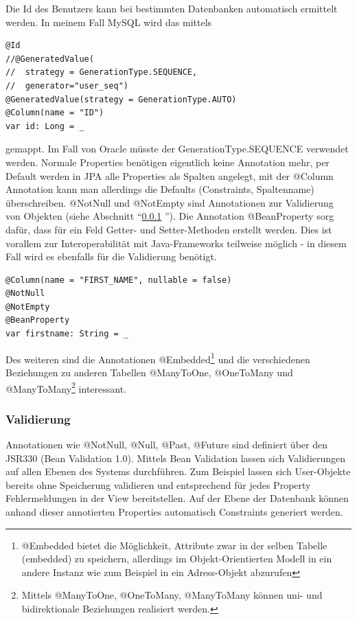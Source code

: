 Die Id des Benutzers kann bei bestimmten Datenbanken automatisch ermittelt werden. In meinem Fall MySQL wird das mittels 
\begin{lstlisting}[caption=User: ScalaJPA Id mit Auto-Increment]
@Id
//@GeneratedValue(
//	strategy = GenerationType.SEQUENCE, 
//	generator="user_seq")
@GeneratedValue(strategy = GenerationType.AUTO)
@Column(name = "ID")
var id: Long = _
\end{lstlisting}
gemappt. Im Fall von Oracle m\"usste der GenerationType.SEQUENCE verwendet werden.
Normale Properties ben\"otigen eigentlich keine Annotation mehr, per Default werden in JPA alle Properties als Spalten angelegt, mit der @Column Annotation kann man allerdings die Defaults (Constraints, Spaltenname) \"uberschreiben. @NotNull und @NotEmpty sind Annotationen zur Validierung von Objekten (siehe Abschnitt ``\ref{jpa:validation} ''). Die Annotation @BeanProperty sorg daf\"ur, dass f\"ur ein Feld Getter- und Setter-Methoden erstellt werden. Dies ist vorallem zur Interoperabilit\"at mit Java-Frameworks teilweise m\"oglich - in diesem Fall wird es ebenfalls f\"ur die Validierung ben\"otigt. 
\begin{lstlisting}[caption=User: ScalaJPA firstname Mapping]
@Column(name = "FIRST_NAME", nullable = false)
@NotNull
@NotEmpty
@BeanProperty
var firstname: String = _
\end{lstlisting}

Des weiteren sind die Annotationen @Embedded\footnote{@Embedded bietet die M\"oglichkeit, Attribute zwar in der selben Tabelle (embedded) zu speichern, allerdings im Objekt-Orientierten Modell in ein andere Instanz wie zum Beispiel in ein Adress-Objekt abzurufen} und die verschiedenen Beziehungen zu anderen Tabellen @ManyToOne, @OneToMany und @ManyToMany\footnote{Mittels @ManyToOne, @OneToMany, @ManyToMany k\"onnen uni- und bidirektionale Beziehungen realisiert werden.} interessant. 



\subsubsection{Validierung}\label{jpa:validation}
Annotationen wie @NotNull, @Null, @Past, @Future sind definiert \"uber den JSR330 (Bean Validation 1.0). Mittels Bean Validation lassen sich Validierungen auf allen Ebenen des Systems durchf\"uhren. Zum Beispiel lassen sich User-Objekte bereits ohne Speicherung validieren und entsprechend f\"ur jedes Property Fehlermeldungen in der View bereitstellen. Auf der Ebene der Datenbank k\"onnen anhand dieser annotierten Properties automatisch Constraints  generiert werden.

